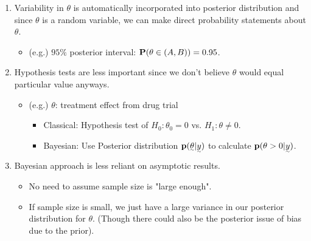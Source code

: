 \begin{enumerate}
    \item Variability in $\theta$ is automatically incorporated into posterior distribution and since $\theta$ is a random variable, we can make direct probability statements about $\theta$.
    \begin{itemize}
        \item (e.g.) $95\%$ posterior interval: $\P(\theta \in (A, B)) = 0.95$.
    \end{itemize}
    \item Hypothesis tests are less important since we don't believe $\theta$ would equal particular value anyways.
    \begin{itemize}
        \item (e.g.) $\theta$: treatment effect from drug trial
        \begin{itemize}
            \item Classical: Hypothesis test of $H_0: \theta_0 = 0$ vs. $H_1: \theta \neq 0$.
            \item Bayesian: Use Posterior distribution $\p(\vec{\theta} | \vec{y})$ to calculate $\p(\theta > 0 | \vec{y})$.
        \end{itemize}
    \end{itemize}
    \item Bayesian approach is less reliant on asymptotic results.
    \begin{itemize}
        \item No need to assume sample size is "large enough".
        \item If sample size is small, we just have a large variance in our posterior distribution for $\theta$. (Though there could also be the posterior issue of bias due to the prior).
    \end{itemize}
\end{enumerate}

